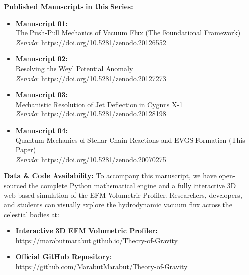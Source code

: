 \documentclass[11pt, a4paper]{article}
\begin{document}
  \vspace{1em}
  \noindent \textbf{Published Manuscripts in this Series:}
  \begin{itemize}
    \item \textbf{Manuscript 01:} \\ The Push-Pull Mechanics of Vacuum Flux (The Foundational Framework) \\ \textit{Zenodo}: \url{https://doi.org/10.5281/zenodo.20126552}
    
    \item \textbf{Manuscript 02:} \\ Resolving the Weyl Potential Anomaly \\ \textit{Zenodo}: \url{https://doi.org/10.5281/zenodo.20127273}

    \item \textbf{Manuscript 03:} \\ Mechanistic Resolution of Jet Deflection in Cygnus X-1 \\ \textit{Zenodo}: \url{https://doi.org/10.5281/zenodo.20128198}

    \item \textbf{Manuscript 04:} \\ Quantum Mechanics of Stellar Chain Reactions and EVGS Formation (This Paper) \\ \textit{Zenodo}: \url{https://doi.org/10.5281/zenodo.20070275}
  \end{itemize}

  \vspace{1em}
  \noindent \textbf{Data \& Code Availability:} To accompany this manuscript, we have open-sourced the complete Python mathematical engine and a fully interactive 3D web-based simulation of the EFM Volumetric Profiler. Researchers, developers, and students can visually explore the hydrodynamic vacuum flux across the celestial bodies at: 
  \begin{itemize}
    \item \textbf{Interactive 3D EFM Volumetric Profiler:} \\ \url{https://marabutmarabut.github.io/Theory-of-Gravity}
    \item \textbf{Official GitHub Repository:} \\ \url{https://github.com/MarabutMarabut/Theory-of-Gravity}
  \end{itemize}

\clearpage
\end{document}
